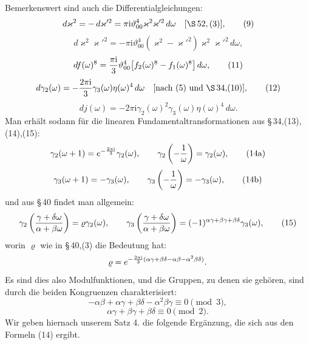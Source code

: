 \documentclass[11pt]{article}
\providecommand{\dd}{\,d}
\providecommand{\tht}{\vartheta}
\providecommand{\ii}{\mathrm{i}}
\begin{document}
Bemerkenswert sind auch die Differentialgleichungen:
\begin{equation}
\dd\varkappa^2=-\dd\varkappa'^2=\pi\ii\tht_{00}^4\varkappa^2\varkappa'^2\dd\omega
\quad[\S\,52,(3)],
\tag{9}
\end{equation}
\begin{equation}
\dd\varkappa^2\varkappa'^2=-\pi\ii\tht_{00}^4(\varkappa^2-\varkappa'^2)\varkappa^2\varkappa'^2\dd\omega,
\tag{10}
\end{equation}
\begin{equation}
\dd f(\omega)^8={\pi\ii\over3}\tht_{00}^4\bigl[f_2(\omega)^8-f_1(\omega)^8\bigr]\dd\omega,
\tag{11}
\end{equation}
\begin{equation}
\dd\gamma_2(\omega)=-{2\pi\ii\over3}\gamma_3(\omega)\eta(\omega)^4\dd\omega
\quad\text{[nach (5) und \S\,34,(10)]},
\tag{12}
\end{equation}
\begin{equation}
\dd j(\omega)=-2\pi\ii\gamma_2(\omega)^2\gamma_3(\omega)\eta(\omega)^4\dd\omega.
\tag{13}
\end{equation}
Man erhält sodann für die linearen Fundamentaltransformationen aus \S\,34,(13),(14),(15):
\begin{equation}
\gamma_2(\omega+1)=e^{-{2\pi\ii\over3}}\gamma_2(\omega),
\qquad
\gamma_2\left(-{1\over\omega}\right)=\gamma_2(\omega),
\tag{14a}
\end{equation}
\begin{equation}
\gamma_3(\omega+1)=-\gamma_3(\omega),
\qquad
\gamma_3\left(-{1\over\omega}\right)=-\gamma_3(\omega),
\tag{14b}
\end{equation}
und aus \S\,40 findet man allgemein:
\begin{equation}
\gamma_2\left({\gamma+\delta\omega\over\alpha+\beta\omega}\right)=\varrho\gamma_2(\omega),
\qquad
\gamma_3\left({\gamma+\delta\omega\over\alpha+\beta\omega}\right)=(-1)^{\alpha\gamma+\beta\gamma+\beta\delta}\gamma_3(\omega),
\tag{15}
\end{equation}
worin $\varrho$ wie in \S\,40,(3) die Bedeutung hat:
\[
\varrho=e^{-{2\pi\ii\over3}(\alpha\gamma+\beta\delta-\alpha\beta-\alpha^2\beta\delta)}.
\]
Es sind dies also Modulfunktionen, und die Gruppen, zu denen sie gehören, sind durch die beiden Kongruenzen charakterisiert:
\[
-\alpha\beta+\alpha\gamma+\beta\delta-\alpha^2\beta\gamma\equiv0\pmod3,
\]
\[
\alpha\gamma+\beta\gamma+\beta\delta\equiv0\pmod2.
\]
Wir geben hiernach unserem Satz 4. die folgende Ergänzung, die sich aus den Formeln (14) ergibt.
\end{document}
